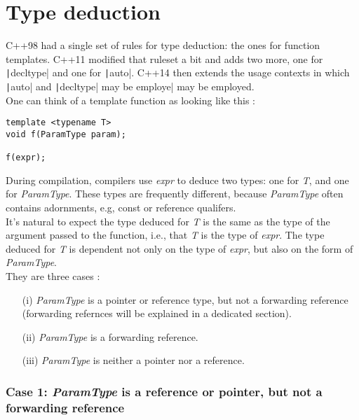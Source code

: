 \section*{Type deduction}

C++98 had a single set of rules for type deduction: the ones for function templates. C++11 modified that ruleset a bit and adds two more, one for \texttt|decltype| and one for \texttt|auto|. C++14 then extends the usage contexts in which \texttt|auto| and \texttt|decltype| may be employe| may be employed. \\

One can think of a template function as looking like this :

\begin{verbatim}
template <typename T>
void f(ParamType param);

f(expr);
\end{verbatim}

During compilation, compilers use \textit{expr} to deduce two types: one for \textit{T}, and one for \textit{ParamType}. These types are frequently different, because \textit{ParamType} often contains adornments, e.g, const or reference qualifers. \\

It's natural to expect the type deduced for \textit{T} is the same as the type of the argument passed to the function, i.e., that \textit{T} is the type of \textit{expr}. The type deduced for \textit{T} is dependent not only on the type of \textit{expr}, but also on the form of \textit{ParamType}. \\

They are three cases :

\begin{itemize}
    \item[(i)] \textit{ParamType} is a pointer or reference type, but not a forwarding reference (forwarding refernces will be explained in a dedicated section).

    \item[(ii)] \textit{ParamType} is a forwarding reference.
    \item[(iii)] \textit{ParamType} is neither a pointer nor a reference.
\end{itemize}

\hrulefill

\subsubsection*{Case 1: \textit{ParamType} is a reference or pointer, but not a forwarding reference}

